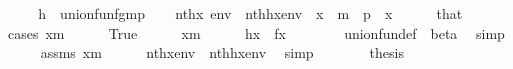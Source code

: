 \begin{isabellebody}
%
\isadelimproof
%
\endisadelimproof
%
\isatagproof
{}\isamarkupfalse%
\ {\isacharminus}{\kern0pt}\isanewline
\ \ \isamarkupfalse%
\ {\isacharquery}{\kern0pt}h\ {\isacharequal}{\kern0pt}\ {\isachardoublequoteopen}union{\isacharunderscore}{\kern0pt}fun{\isacharparenleft}{\kern0pt}f{\isacharcomma}{\kern0pt}g{\isacharcomma}{\kern0pt}m{\isacharcomma}{\kern0pt}p{\isacharparenright}{\kern0pt}{\isachardoublequoteclose}\isanewline
\ \ \isamarkupfalse%
\ {\isachardoublequoteopen}nth{\isacharparenleft}{\kern0pt}x{\isacharcomma}{\kern0pt}\ env{\isacharparenright}{\kern0pt}\ {\isacharequal}{\kern0pt}\ nth{\isacharparenleft}{\kern0pt}{\isacharquery}{\kern0pt}h{\isacharbackquote}{\kern0pt}x{\isacharcomma}{\kern0pt}env{\isacharprime}{\kern0pt}{\isacharparenright}{\kern0pt}{\isachardoublequoteclose}\ \ {\isachardoublequoteopen}x\ {\isasymin}\ m\ {\isasymunion}\ p{\isachardoublequoteclose}\ \ x\isanewline
\ \ \ \ \isamarkupfalse%
\ that\isanewline
\ \ \isamarkupfalse%
\ {\isacharparenleft}{\kern0pt}cases\ {\isachardoublequoteopen}x{\isasymin}m{\isachardoublequoteclose}{\isacharparenright}{\kern0pt}\isanewline
\ \ \ \ \isamarkupfalse%
\ True\isanewline
\ \ \ \ \isamarkupfalse%
\ {\isacartoucheopen}x{\isasymin}m{\isacartoucheclose}\isanewline
\ \ \ \ \isamarkupfalse%
\ {\isachardoublequoteopen}{\isacharquery}{\kern0pt}h{\isacharbackquote}{\kern0pt}x\ {\isacharequal}{\kern0pt}\ f{\isacharbackquote}{\kern0pt}x{\isachardoublequoteclose}\isanewline
\ \ \ \ \ \ \isamarkupfalse%
\ union{\isacharunderscore}{\kern0pt}fun{\isacharunderscore}{\kern0pt}def\ \ beta\ \isamarkupfalse%
\ simp\isanewline
\ \ \ \ \isamarkupfalse%
\ assms\ {\isacartoucheopen}x{\isasymin}m{\isacartoucheclose}\isanewline
\ \ \ \ \isamarkupfalse%
\ {\isachardoublequoteopen}nth{\isacharparenleft}{\kern0pt}x{\isacharcomma}{\kern0pt}env{\isacharparenright}{\kern0pt}\ {\isacharequal}{\kern0pt}\ nth{\isacharparenleft}{\kern0pt}{\isacharquery}{\kern0pt}h{\isacharbackquote}{\kern0pt}x{\isacharcomma}{\kern0pt}env{\isacharprime}{\kern0pt}{\isacharparenright}{\kern0pt}{\isachardoublequoteclose}\ \isamarkupfalse%
\ simp\isanewline
\ \ \ \ \isamarkupfalse%
\ \isamarkupfalse%
\ {\isacharquery}{\kern0pt}thesis\ \isacommand{{\isachardot}{\kern0pt}}\isamarkupfalse%
\isanewline
\ \ \isamarkupfalse%
\isanewline
\ \ \ \ \isamarkupfalse%

\end{isabellebody}
